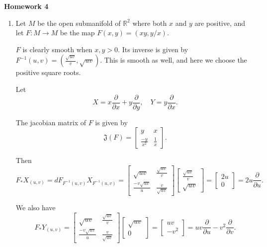 \documentclass[11pt, reqno]{article}
\theoremstyle{plain}
\theoremstyle{definition}
\theoremstyle{remark}
\newcommand{\RR}{\mathbb{R}}
\begin{document}
\topmargin=-40pt
\renewcommand{\headrulewidth}{1pt}
\renewcommand{\headsep}{20pt}
\thispagestyle{fancy}

{\Huge \bfseries \noindent Homework 4}

\begin{enumerate}
    \item[1.] Let $M$ be the open submanifold of $\RR^2$ where both $x$ and $y$ are positive, and let 
    $F: M \to M$ be the map $F(x,y) = (xy, y/x)$. 

    $F$ is clearly smooth when $x, y > 0$. Its inverse is given by $F^{-1}(u,v) = (\frac{\sqrt{uv}}{v}, \sqrt{uv})$.
    This is smooth as well, and here we choose the positive square roots. 

    Let 
    \[
        X = x \frac{\partial}{\partial x} + y \frac{\partial}{\partial y},\quad Y = y \frac{\partial}{\partial x}. 
    \]

    The jacobian matrix of $F$ is given by
    \[
        \mathfrak{J}(F) = \begin{bmatrix}y & x \\ \frac{-y}{x^2} & \frac{1}{x}\end{bmatrix}.
    \]

    Then
    \[
        F_* X_{(u,v)} = d F_{F^{-1}(u,v)}X_{F^{-1}(u,v)} = 
        \begin{bmatrix}\sqrt{uv} & \frac{\sqrt{uv}}{v}\\ \frac{-v\sqrt{uv}}{u} & \frac{v}{\sqrt{uv}}\end{bmatrix}
        \begin{bmatrix}\frac{\sqrt{uv}}{v} \\ \sqrt{uv}\end{bmatrix} = 
        \begin{bmatrix}2u \\ 0\end{bmatrix} = 2u \frac{\partial}{\partial u}.
    \]

    We also have 
    \[
        F_* Y_{(u,v)} = 
        \begin{bmatrix}\sqrt{uv} & \frac{\sqrt{uv}}{v}\\ \frac{-v\sqrt{uv}}{u} & \frac{v}{\sqrt{uv}}\end{bmatrix}
        \begin{bmatrix}\sqrt{uv} \\ 0\end{bmatrix} = 
        \begin{bmatrix}uv \\ -v^2\end{bmatrix} = uv \frac{\partial}{\partial u} - v^2 \frac{\partial}{\partial v}.
    \]


\end{enumerate}
\end{document}
